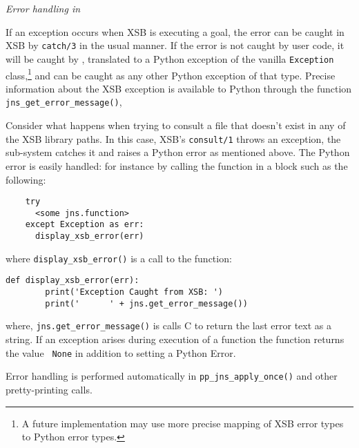 \begin{example} \rm {\it Error handling in \januspy} \label{ex:janus-py-errors}

If an exception occurs when XSB is executing a goal, the error can be
caught in XSB by {\tt catch/3} in the usual manner.  If the error is
not caught by user code, it will be caught by \januspy{}, translated
to a Python exception of the vanilla {\tt Exception} class,\footnote{A
future implementation may use more precise mapping of XSB error types
to Python error types.}  and can be caught as any other Python
exception of that type.  Precise information about the XSB exception
is available to Python through the \januspy{} function {\tt
  jns\_get\_error\_message()},

Consider what happens when trying to consult a file that doesn't exist
in any of the XSB library paths.  In this case, XSB's {\tt consult/1}
throws an exception, the \januspy{} sub-system catches it and raises a
Python error as mentioned above.  The Python error is easily handled:
for instance by calling the function in a block such as the following:
\begin{verbatim}
    try
      <some jns.function>
    except Exception as err:
      display_xsb_error(err)
\end{verbatim}
\noindent
where {\tt display\_xsb\_error()} is a call to the function:

\begin{verbatim}
def display_xsb_error(err):    
        print('Exception Caught from XSB: ')
        print('      ' + jns.get_error_message())
\end{verbatim}
\noindent
where, {\tt jns.get\_error\_message()} is calls C to return the last
\januspy{} error text as a string.  If an exception arises during
execution of a \januspy{} function the function returns the value {\tt
  None} in addition to setting a Python Error.

Error handling is performed automatically in {\tt pp\_jns\_apply\_once()}
and other pretty-printing calls.

%
%
\end{example}

